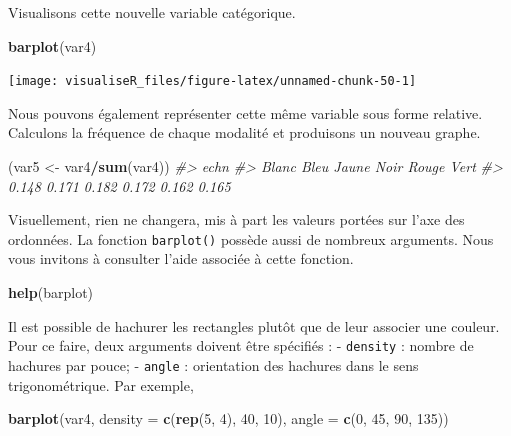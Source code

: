\documentclass[]{article}
\newenvironment{Shaded}{\begin{snugshade}}{\end{snugshade}}
\newcommand{\CommentTok}[1]{\textcolor[rgb]{0.56,0.35,0.01}{\textit{#1}}}
\newcommand{\DataTypeTok}[1]{\textcolor[rgb]{0.13,0.29,0.53}{#1}}
\newcommand{\DecValTok}[1]{\textcolor[rgb]{0.00,0.00,0.81}{#1}}
\newcommand{\KeywordTok}[1]{\textcolor[rgb]{0.13,0.29,0.53}{\textbf{#1}}}
\newcommand{\NormalTok}[1]{#1}
\newcommand{\OperatorTok}[1]{\textcolor[rgb]{0.81,0.36,0.00}{\textbf{#1}}}
\newcommand{\StringTok}[1]{\textcolor[rgb]{0.31,0.60,0.02}{#1}}
\begin{document}
Visualisons cette nouvelle variable catégorique.

\begin{Shaded}
\begin{Highlighting}[]
\KeywordTok{barplot}\NormalTok{(var4)}
\end{Highlighting}
\end{Shaded}

\begin{center}\texttt{[image: visualiseR\_files/figure-latex/unnamed-chunk-50-1]} \end{center}

Nous pouvons également représenter cette même variable sous forme relative. Calculons la fréquence de chaque modalité et produisons un nouveau graphe.

\begin{Shaded}
\begin{Highlighting}[]
\NormalTok{(var5 <-}\StringTok{ }\NormalTok{var4}\OperatorTok{/}\KeywordTok{sum}\NormalTok{(var4))}
\CommentTok{#> echn}
\CommentTok{#> Blanc  Bleu Jaune  Noir Rouge  Vert }
\CommentTok{#> 0.148 0.171 0.182 0.172 0.162 0.165}
\end{Highlighting}
\end{Shaded}

Visuellement, rien ne changera, mis à part les valeurs portées sur l'axe des ordonnées. La fonction \texttt{barplot()} possède aussi de nombreux arguments. Nous vous invitons à consulter l'aide associée à cette fonction.

\begin{Shaded}
\begin{Highlighting}[]
\KeywordTok{help}\NormalTok{(barplot)}
\end{Highlighting}
\end{Shaded}

Il est possible de hachurer les rectangles plutôt que de leur associer une couleur. Pour ce faire, deux arguments doivent être spécifiés :
- \texttt{density} : nombre de hachures par pouce;
- \texttt{angle} : orientation des hachures dans le sens trigonométrique.
Par exemple,

\begin{Shaded}
\begin{Highlighting}[]
\KeywordTok{barplot}\NormalTok{(var4, }\DataTypeTok{density =} \KeywordTok{c}\NormalTok{(}\KeywordTok{rep}\NormalTok{(}\DecValTok{5}\NormalTok{, }\DecValTok{4}\NormalTok{), }\DecValTok{40}\NormalTok{, }\DecValTok{10}\NormalTok{), }\DataTypeTok{angle =} \KeywordTok{c}\NormalTok{(}\DecValTok{0}\NormalTok{, }\DecValTok{45}\NormalTok{, }\DecValTok{90}\NormalTok{, }\DecValTok{135}\NormalTok{))}
\end{Highlighting}
\end{Shaded}
\end{document}
